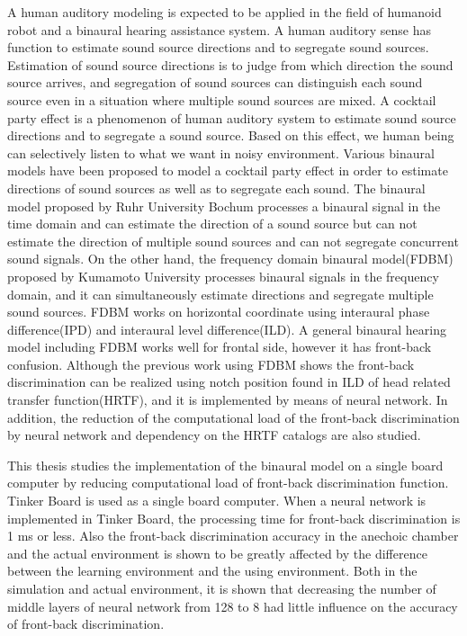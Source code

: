 
A human auditory modeling is expected to be applied in the field of humanoid robot and a binaural hearing assistance system. A human auditory sense has function to estimate sound source directions and to segregate sound sources. Estimation of sound source directions is to judge from which direction the sound source arrives, and segregation of sound sources can distinguish each sound source even in a situation where multiple sound sources are mixed. 
A cocktail party effect is a phenomenon of human auditory system to estimate sound source directions and to segregate a sound source. Based on this effect, we human being can selectively listen to what we want in noisy environment.
Various binaural models have been proposed to model a cocktail party effect in order to estimate directions of sound sources as well as to segregate each sound. The binaural model proposed by Ruhr University Bochum processes a binaural signal in the time domain and can estimate the direction of a sound source but can not estimate the direction of multiple sound sources and can not segregate concurrent sound signals. On the other hand, the frequency domain binaural model(FDBM) proposed by Kumamoto University processes binaural signals in the frequency domain, and it can simultaneously estimate directions and segregate multiple sound sources.
FDBM works on horizontal coordinate using interaural phase difference(IPD) and interaural level difference(ILD). A general binaural hearing model including FDBM works well for frontal side, however it has front-back confusion. Although the previous work using FDBM shows the front-back discrimination can be realized using notch position found in ILD of head related transfer function(HRTF), and it is implemented by means of neural network. In addition, the reduction of the computational load of the front-back discrimination by neural network and dependency on the HRTF catalogs are also studied.

This thesis studies the implementation of the binaural model on a single board computer by reducing computational load of front-back discrimination function. Tinker Board is used as a single board computer. When a neural network is implemented in Tinker Board, the processing time for front-back discrimination is 1 ms or less. Also the front-back discrimination accuracy in the anechoic chamber and the actual environment is shown to be greatly affected by the difference between the learning environment and the using environment. Both in the simulation and actual environment, it is shown that decreasing the number of middle layers of neural network from 128 to 8 had little influence on the accuracy of front-back discrimination.

